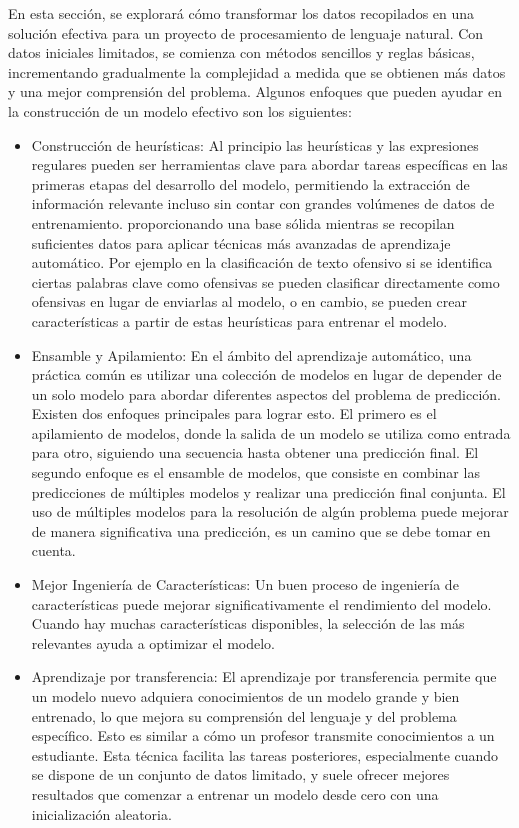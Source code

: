 En esta sección, se explorará cómo transformar los datos recopilados en una solución efectiva para un proyecto de procesamiento de lenguaje natural. Con datos iniciales limitados, se comienza con métodos sencillos y reglas básicas, incrementando gradualmente la complejidad a medida que se obtienen más datos y una mejor comprensión del problema. Algunos enfoques que pueden ayudar en la construcción de un modelo efectivo son los siguientes:

\begin{itemize}

\item Construcción de heurísticas: Al principio las heurísticas y las expresiones regulares pueden ser herramientas clave para abordar tareas específicas en las primeras etapas del desarrollo del modelo, permitiendo la extracción de información relevante incluso sin contar con grandes volúmenes de datos de entrenamiento. proporcionando una base sólida mientras se recopilan suficientes datos para aplicar técnicas más avanzadas de aprendizaje automático. Por ejemplo en la clasificación de texto ofensivo si se identifica ciertas palabras clave como ofensivas se pueden clasificar directamente como ofensivas en lugar de enviarlas al modelo, o en cambio, se pueden crear características a partir de estas heurísticas para entrenar el modelo.

\item Ensamble y Apilamiento: En el ámbito del aprendizaje automático, una práctica común es utilizar una colección de modelos en lugar de depender de un solo modelo para abordar diferentes aspectos del problema de predicción. Existen dos enfoques principales para lograr esto. El primero es el apilamiento de modelos, donde la salida de un modelo se utiliza como entrada para otro, siguiendo una secuencia hasta obtener una predicción final. El segundo enfoque es el ensamble de modelos, que consiste en combinar las predicciones de múltiples modelos y realizar una predicción final conjunta. El uso de múltiples modelos para la resolución de algún problema puede mejorar de manera significativa una predicción, es un camino que se debe tomar en cuenta.

\item Mejor Ingeniería de Características: Un buen proceso de ingeniería de características puede mejorar significativamente el rendimiento del modelo. Cuando hay muchas características disponibles, la selección de las más relevantes ayuda a optimizar el modelo.

\item Aprendizaje por transferencia: El aprendizaje por transferencia permite que un modelo nuevo adquiera conocimientos de un modelo grande y bien entrenado, lo que mejora su comprensión del lenguaje y del problema específico. Esto es similar a cómo un profesor transmite conocimientos a un estudiante. Esta técnica facilita las tareas posteriores, especialmente cuando se dispone de un conjunto de datos limitado, y suele ofrecer mejores resultados que comenzar a entrenar un modelo desde cero con una inicialización aleatoria.


\end{itemize}

